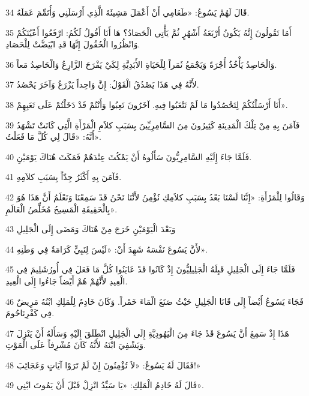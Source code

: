 \par 34 قَالَ لَهُمْ يَسُوعُ: «طَعَامِي أَنْ أَعْمَلَ مَشِيئَةَ الَّذِي أَرْسَلَنِي وَأُتَمِّمَ عَمَلَهُ.
\par 35 أَمَا تَقُولُونَ إِنَّهُ يَكُونُ أَرْبَعَةُ أَشْهُرٍ ثُمَّ يَأْتِي الْحَصَادُ؟ هَا أَنَا أَقُولُ لَكُمُ: ارْفَعُوا أَعْيُنَكُمْ وَانْظُرُوا الْحُقُولَ إِنَّهَا قَدِ ابْيَضَّتْ لِلْحَصَادِ.
\par 36 وَالْحَاصِدُ يَأْخُذُ أُجْرَةً وَيَجْمَعُ ثَمَراً لِلْحَيَاةِ الأَبَدِيَّةِ لِكَيْ يَفْرَحَ الزَّارِعُ وَالْحَاصِدُ مَعاً.
\par 37 لأَنَّهُ فِي هَذَا يَصْدُقُ الْقَوْلُ: إِنَّ وَاحِداً يَزْرَعُ وَآخَرَ يَحْصُدُ.
\par 38 أَنَا أَرْسَلْتُكُمْ لِتَحْصُدُوا مَا لَمْ تَتْعَبُوا فِيهِ. آخَرُونَ تَعِبُوا وَأَنْتُمْ قَدْ دَخَلْتُمْ عَلَى تَعَبِهِمْ».
\par 39 فَآمَنَ بِهِ مِنْ تِلْكَ الْمَدِينَةِ كَثِيرُونَ مِنَ السَّامِرِيِّينَ بِسَبَبِ كلاَمِ الْمَرْأَةِ الَّتِي كَانَتْ تَشْهَدُ أَنَّهُ: «قَالَ لِي كُلَّ مَا فَعَلْتُ».
\par 40 فَلَمَّا جَاءَ إِلَيْهِ السَّامِرِيُّونَ سَأَلُوهُ أَنْ يَمْكُثَ عِنْدَهُمْ فَمَكَثَ هُنَاكَ يَوْمَيْنِ.
\par 41 فَآمَنَ بِهِ أَكْثَرُ جِدّاً بِسَبَبِ كلاَمِهِ.
\par 42 وَقَالُوا لِلْمَرْأَةِ: «إِنَّنَا لَسْنَا بَعْدُ بِسَبَبِ كلاَمِكِ نُؤْمِنُ لأَنَّنَا نَحْنُ قَدْ سَمِعْنَا وَنَعْلَمُ أَنَّ هَذَا هُوَ بِالْحَقِيقَةِ الْمَسِيحُ مُخَلِّصُ الْعَالَمِ».
\par 43 وَبَعْدَ الْيَوْمَيْنِ خَرَجَ مِنْ هُنَاكَ وَمَضَى إِلَى الْجَلِيلِ
\par 44 لأَنَّ يَسُوعَ نَفْسَهُ شَهِدَ أَنْ: «لَيْسَ لِنَبِيٍّ كَرَامَةٌ فِي وَطَنِهِ».
\par 45 فَلَمَّا جَاءَ إِلَى الْجَلِيلِ قَبِلَهُ الْجَلِيلِيُّونَ إِذْ كَانُوا قَدْ عَايَنُوا كُلَّ مَا فَعَلَ فِي أُورُشَلِيمَ فِي الْعِيدِ لأَنَّهُمْ هُمْ أَيْضاً جَاءُوا إِلَى الْعِيدِ.
\par 46 فَجَاءَ يَسُوعُ أَيْضاً إِلَى قَانَا الْجَلِيلِ حَيْثُ صَنَعَ الْمَاءَ خَمْراً. وَكَانَ خَادِمٌ لِلْمَلِكِ ابْنُهُ مَرِيضٌ فِي كَفْرِنَاحُومَ.
\par 47 هَذَا إِذْ سَمِعَ أَنَّ يَسُوعَ قَدْ جَاءَ مِنَ الْيَهُودِيَّةِ إِلَى الْجَلِيلِ انْطَلَقَ إِلَيْهِ وَسَأَلَهُ أَنْ يَنْزِلَ وَيَشْفِيَ ابْنَهُ لأَنَّهُ كَانَ مُشْرِفاً عَلَى الْمَوْتِ.
\par 48 فَقَالَ لَهُ يَسُوعُ: «لاَ تُؤْمِنُونَ إِنْ لَمْ تَرَوْا آيَاتٍ وَعَجَائِبَ!»
\par 49 قَالَ لَهُ خَادِمُ الْمَلِكِ: «يَا سَيِّدُ انْزِلْ قَبْلَ أَنْ يَمُوتَ ابْنِي».
